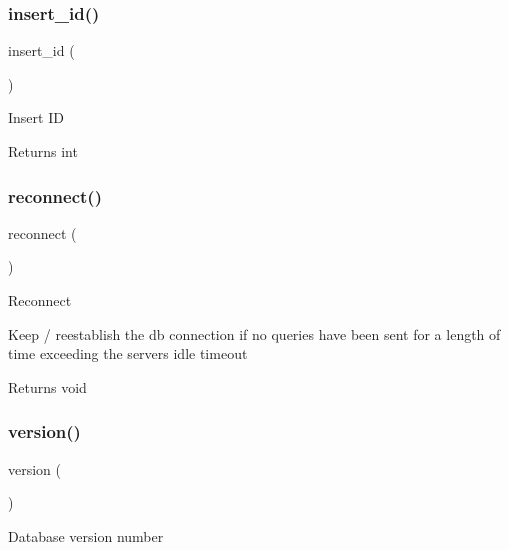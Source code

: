 \subsubsection{\texorpdfstring{insert\+\_\+id()}{insert\_id()}}
{\footnotesize\ttfamily insert\+\_\+id (\begin{DoxyParamCaption}{ }\end{DoxyParamCaption})}

Insert ID

\begin{DoxyReturn}{Returns}
int 
\end{DoxyReturn}
\mbox{\label{class_c_i___d_b__mysqli__driver_a57c19c642ab3023e28d10c50f86ff0a8}} 
\subsubsection{\texorpdfstring{reconnect()}{reconnect()}}
{\footnotesize\ttfamily reconnect (\begin{DoxyParamCaption}{ }\end{DoxyParamCaption})}

Reconnect

Keep / reestablish the db connection if no queries have been sent for a length of time exceeding the server\textquotesingle{}s idle timeout

\begin{DoxyReturn}{Returns}
void 
\end{DoxyReturn}
\mbox{\label{class_c_i___d_b__mysqli__driver_a6080dae0886626b9a4cedb29240708b1}} 
\subsubsection{\texorpdfstring{version()}{version()}}
{\footnotesize\ttfamily version (\begin{DoxyParamCaption}{ }\end{DoxyParamCaption})}

Database version number

